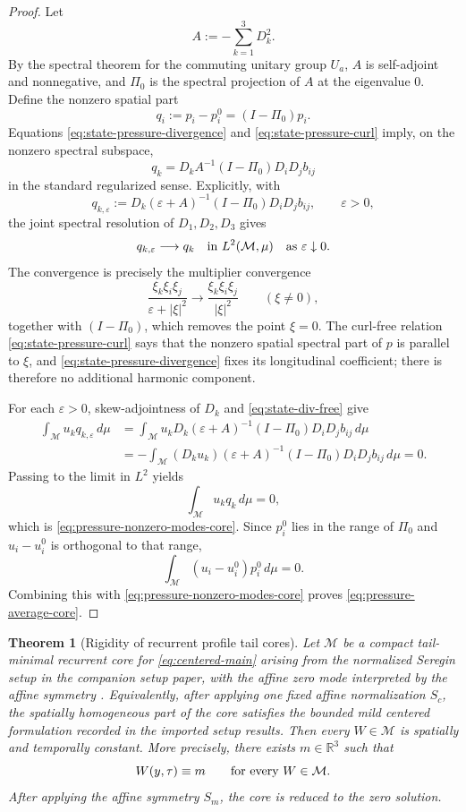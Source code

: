\documentclass[11pt]{amsart}
\numberwithin{equation}{section}
\theoremstyle{plain}
\newtheorem{theorem}{Theorem}[section]
\theoremstyle{definition}
\theoremstyle{remark}
\newcommand{\R}{\mathbb R}
\newcommand{\calM}{\mathcal M}
\begin{document}
\begin{proof}
Let
\[
   A:=-\sum_{k=1}^3D_k^2.
\]
By the spectral theorem for the commuting unitary group \(U_a\), \(A\) is
self-adjoint and nonnegative, and \(\Pi_0\) is the spectral projection
of \(A\) at the eigenvalue \(0\).  Define the nonzero spatial part
\[
   q_i:=p_i-p_i^0=(I-\Pi_0)p_i .
\]
Equations \eqref{eq:state-pressure-divergence} and
\eqref{eq:state-pressure-curl} imply, on the nonzero spectral subspace,
\[
   q_k
   =
   D_kA^{-1}(I-\Pi_0)D_iD_jb_{ij}
\]
in the standard regularized sense.  Explicitly, with
\[
   q_{k,\varepsilon}
   :=
   D_k(\varepsilon+A)^{-1}(I-\Pi_0)D_iD_jb_{ij},
   \qquad \varepsilon>0,
\]
the joint spectral resolution of \(D_1,D_2,D_3\) gives
\[
   q_{k,\varepsilon}\longrightarrow q_k
   \quad\hbox{in }L^2(\calM,\mu)
   \quad\hbox{as }\varepsilon\downarrow0.
\]
The convergence is precisely the multiplier convergence
\[
   \frac{\xi_k\xi_i\xi_j}{\varepsilon+|\xi|^2}
      \longrightarrow
   \frac{\xi_k\xi_i\xi_j}{|\xi|^2}
   \qquad (\xi\ne0),
\]
together with \((I-\Pi_0)\), which removes the point \(\xi=0\).  The
curl-free relation \eqref{eq:state-pressure-curl} says that the nonzero
spatial spectral part of \(p\) is parallel to \(\xi\), and
\eqref{eq:state-pressure-divergence} fixes its longitudinal coefficient;
there is therefore no additional harmonic component.

For each \(\varepsilon>0\), skew-adjointness of \(D_k\) and
\eqref{eq:state-div-free} give
\begin{align*}
   \int_{\calM}u_k q_{k,\varepsilon}\,d\mu
   &=
   \int_{\calM}
      u_kD_k(\varepsilon+A)^{-1}(I-\Pi_0)D_iD_jb_{ij}\,d\mu \\
   &=
   -\int_{\calM}
      (D_ku_k)(\varepsilon+A)^{-1}(I-\Pi_0)D_iD_jb_{ij}\,d\mu
   =0 .
\end{align*}
Passing to the limit in \(L^2\) yields
\[
   \int_{\calM}u_k q_k\,d\mu=0,
\]
which is \eqref{eq:pressure-nonzero-modes-core}.  Since \(p_i^0\) lies in the
range of \(\Pi_0\) and \(u_i-u_i^0\) is orthogonal to that range,
\[
   \int_{\calM}(u_i-u_i^0)p_i^0\,d\mu=0 .
\]
Combining this with \eqref{eq:pressure-nonzero-modes-core} proves
\eqref{eq:pressure-average-core}.
\end{proof}

\begin{theorem}[Rigidity of recurrent profile tail cores]
\label{thm:recurrent-tail-core-rigidity}
Let \(\calM\) be a compact tail-minimal recurrent core for
\eqref{eq:centered-main} arising from the normalized Seregin setup in
the companion setup paper,
with the affine zero mode interpreted by the affine symmetry
.  Equivalently, after applying one fixed affine
normalization \(S_c\), the spatially homogeneous part of the core satisfies the
bounded mild centered formulation recorded in
the imported setup results.  Then
every \(W\in\calM\) is spatially and temporally constant.
More precisely, there exists \(m\in\R^3\) such that
\[
   W(y,\tau)\equiv m
   \qquad
   \hbox{for every }W\in\calM.
\]
After applying the affine symmetry \(S_m\), the core is reduced to the zero
solution.
\end{theorem}
\end{document}
